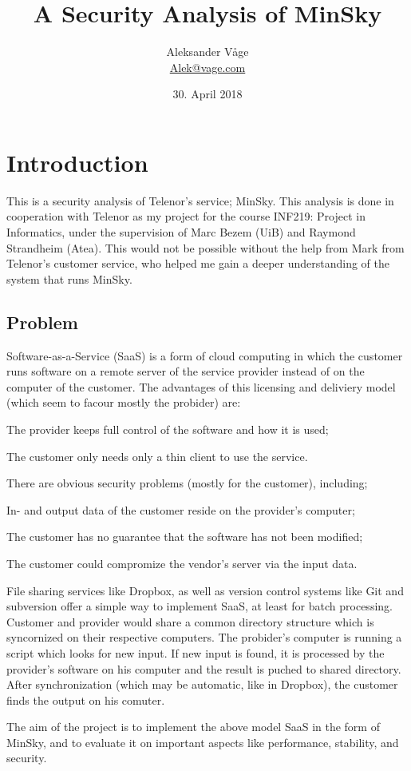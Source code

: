 \documentclass{article}
\title{A Security Analysis of MinSky}
\author{Aleksander V\aa ge \\ \url{Alek@vage.com}}
\date{30. April 2018}
\begin{document}
\pagestyle{fancy}
\lhead{\today}
\chead{}
\lfoot{}
\cfoot{}
\rfoot{\thepage}

\renewcommand{\familydefault}{\sfdefault}
\selectfont

\maketitle
\newpage
\tableofcontents
\newpage

\section{Introduction}
This is a security analysis of Telenor's service; MinSky. This analysis is done in cooperation with Telenor as my project for the course INF219: Project in Informatics, under the supervision of Marc Bezem (UiB) and Raymond Strandheim (Atea).
This would not be possible without the help from Mark from Telenor's customer service, who helped me gain a deeper understanding of the system that runs MinSky.

\subsection{Problem}
Software-as-a-Service (SaaS) is a form of cloud computing in which the customer runs software on a remote server of the service provider instead of on the computer of the customer. The advantages of this licensing and deliviery model (which seem to facour mostly the probider) are:

The provider keeps full control of the software and how it is used;

The customer only needs only a thin client to use the service.

There are obvious security problems (mostly for the customer), including;

In- and output data of the customer reside on the provider's computer;

The customer has no guarantee that the software has not been modified;

The customer could compromize the vendor's server via the input data. \newline


File sharing services like Dropbox, as well  as version control systems like Git and subversion offer a simple way to implement SaaS, at least for batch processing. Customer and provider would share a common directory structure which is syncornized on their respective computers. The probider's computer is running a script which looks for new input. If new input is found, it is processed by the provider's software on his computer and the result is puched to shared directory. After synchronization (which may be automatic, like in Dropbox), the customer finds the output on his comuter.

The aim of the project is to implement the above model SaaS in the form of MinSky, and to evaluate it on important aspects like performance, stability, and security.
\end{document}
